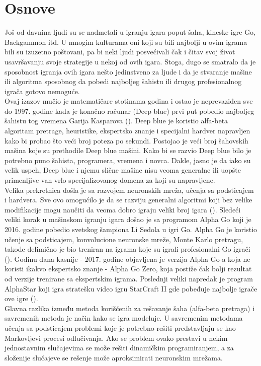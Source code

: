 \documentclass[a4paper,fleqn,12pt]{JMThesis}
\theoremstyle{plain}
\theoremstyle{definition}
\theoremstyle{definition}
\begin{document}
\section[Osnove]{Osnove}
Još od davnina ljudi su se nadmetali u igranju igara poput šaha, 
kineske igre Go, Backgammon itd. 
U mnogim kulturama oni koji su bili najbolji u ovim igrama 
bili su izuzetno poštovani, pa bi neki ljudi posvećivali čak i 
čitav svoj život usavršavanju svoje strategije u nekoj od ovih 
igara. Stoga, dugo se smatralo da je sposobnost igranja ovih igara 
nešto jedinstveno za ljude i da je stvaranje mašine ili algoritma 
sposobnog da pobedi najboljeg šahistu ili drugog profesionalnog 
igrača gotovo nemoguće. \\
Ovaj izazov mučio je matematičare stotinama godina i ostao je 
neprevaziđen sve do 1997. godine kada je konačno računar 
(Deep blue) prvi put pobedio najboljeg šahistu tog 
vremena Garija Kasparova (\cite{campbell2002deep}). 
Deep blue je koristio alfa-beta algoritam pretrage, 
heuristike, ekspertsko znanje i specijalni hardver napravljen 
kako bi probao što veći broj poteza po sekundi. 
Postojao je veći broj šahovskih mašina koje su prethodile 
Deep blue mašini. Kako bi se razvio  Deep blue
bilo je potrebno puno šahista, programera, vremena i novca. 
Dakle, jasno je da iako su velik uspeh,  Deep blue 
i njemu slične mašine nisu veoma generalne ili uopšte primenljive 
van vrlo specijalizovanog domena za koji su napravljene.\\
Velika prekretnica došla je sa razvojem neuronskih mreža, 
učenja sa podsticajem i hardvera. Sve ovo omogućilo je da se 
razviju generalni algoritmi koji bez velike modifikacije mogu 
naučiti da veoma dobro igraju veliki broj igara (\cite{mnih2015human}). 
Sledeći veliki korak u mašinskom igranju igara došao je sa 
programom Alpha Go koji je 2016. godine pobedio 
svetskog šampiona Li Sedola u igri Go. Alpha Go je 
koristio učenje sa podsticajem, konvolucione neuronske mreže, 
Monte Karlo pretragu, takođe delimično je bio treniran na igrama 
koje su igrali profesionalni Go igrači (\cite{silver2017mastering}). 
Godinu dana kasnije - 2017. godine objavljena je verzija Alpha Go-a 
koja ne koristi ikakvo ekspertsko znanje - Alpha Go Zero, 
koja postiže čak bolji rezultat od verzije trenirane sa ekspertskim 
igrama. Poslednji veliki napredak je program AlphaStar
koji igra stratešku video igru StarCraft II gde pobeđuje 
najbolje igrače ove igre (\cite{vinyals2019grandmaster}).\\
Glavna razlika između metoda korišćenih za rešavanje šaha 
(alfa-beta pretraga) i savremenih metoda je način kako se 
igra modeluje. U savremenim metodama učenja sa podsticajem 
problemi koje je potrebno rešiti predstavljaju se kao Markovljevi 
procesi odlučivanja. Ako se problem ovako prestavi u nekim 
jednostavnim slučajevima se može rešiti dinamičkim programiranjem, 
a za složenije slučajeve se rešenje može aproksimirati neuronskim 
mrežama.
\end{document}
